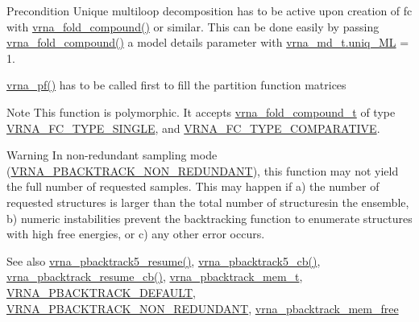 \begin{DoxyPrecond}{Precondition}
Unique multiloop decomposition has to be active upon creation of {\ttfamily fc} with \mbox{\hyperlink{group__fold__compound_ga6601d994ba32b11511b36f68b08403be}{vrna\+\_\+fold\+\_\+compound()}} or similar. This can be done easily by passing \mbox{\hyperlink{group__fold__compound_ga6601d994ba32b11511b36f68b08403be}{vrna\+\_\+fold\+\_\+compound()}} a model details parameter with \mbox{\hyperlink{group__model__details_ade065b814a4e2e72ead93ab502613ed2}{vrna\+\_\+md\+\_\+t.\+uniq\+\_\+\+ML}} = 1. 

\mbox{\hyperlink{group__part__func__global_ga29e256d688ad221b78d37f427e0e99bc}{vrna\+\_\+pf()}} has to be called first to fill the partition function matrices
\end{DoxyPrecond}
\begin{DoxyNote}{Note}
This function is polymorphic. It accepts \mbox{\hyperlink{group__fold__compound_ga1b0cef17fd40466cef5968eaeeff6166}{vrna\+\_\+fold\+\_\+compound\+\_\+t}} of type \mbox{\hyperlink{group__fold__compound_gga01a4ff86fa71deaaa5d1abbd95a1447da7e264dd3cf2dc9b6448caabcb7763cd6}{V\+R\+N\+A\+\_\+\+F\+C\+\_\+\+T\+Y\+P\+E\+\_\+\+S\+I\+N\+G\+LE}}, and \mbox{\hyperlink{group__fold__compound_gga01a4ff86fa71deaaa5d1abbd95a1447dab821ce46ea3cf665be97df22a76f5023}{V\+R\+N\+A\+\_\+\+F\+C\+\_\+\+T\+Y\+P\+E\+\_\+\+C\+O\+M\+P\+A\+R\+A\+T\+I\+VE}}.
\end{DoxyNote}
\begin{DoxyWarning}{Warning}
In non-\/redundant sampling mode (\mbox{\hyperlink{group__subopt__stochbt_ga9d580ce645aa0c38b69afdf56c332200}{V\+R\+N\+A\+\_\+\+P\+B\+A\+C\+K\+T\+R\+A\+C\+K\+\_\+\+N\+O\+N\+\_\+\+R\+E\+D\+U\+N\+D\+A\+NT}}), this function may not yield the full number of requested samples. This may happen if a) the number of requested structures is larger than the total number of structuresin the ensemble, b) numeric instabilities prevent the backtracking function to enumerate structures with high free energies, or c) any other error occurs.
\end{DoxyWarning}
\begin{DoxySeeAlso}{See also}
\mbox{\hyperlink{group__subopt__stochbt_gac5d7065196975b803daeb4e094ba1cb9}{vrna\+\_\+pbacktrack5\+\_\+resume()}}, \mbox{\hyperlink{group__subopt__stochbt_ga626beb5b5b962d7e7c8433cd2cfd4e93}{vrna\+\_\+pbacktrack5\+\_\+cb()}}, \mbox{\hyperlink{group__subopt__stochbt_ga6fc5ce952995e53baef52cad5581c063}{vrna\+\_\+pbacktrack\+\_\+resume\+\_\+cb()}}, \mbox{\hyperlink{group__subopt__stochbt_gaa59c30efbed96bf9aaf8005584c72e63}{vrna\+\_\+pbacktrack\+\_\+mem\+\_\+t}}, \mbox{\hyperlink{group__subopt__stochbt_ga760aa2fb2d5e3d7521a11454a21e9b9f}{V\+R\+N\+A\+\_\+\+P\+B\+A\+C\+K\+T\+R\+A\+C\+K\+\_\+\+D\+E\+F\+A\+U\+LT}}, \mbox{\hyperlink{group__subopt__stochbt_ga9d580ce645aa0c38b69afdf56c332200}{V\+R\+N\+A\+\_\+\+P\+B\+A\+C\+K\+T\+R\+A\+C\+K\+\_\+\+N\+O\+N\+\_\+\+R\+E\+D\+U\+N\+D\+A\+NT}}, \mbox{\hyperlink{group__subopt__stochbt_gae64fbdef59e7f503d7e920aac279212b}{vrna\+\_\+pbacktrack\+\_\+mem\+\_\+free}}
\end{DoxySeeAlso}

